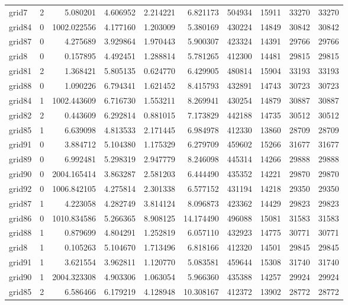\begin{longtable}{|l|r|r|r|r|r|r|r|r|r|}
grid7 & 2 & 5.080201 & 4.606952 & 2.214221 & 6.821173 & 504934 & 15911 & 33270 & 33270 \\
grid84 & 0 & 1002.022556 & 4.177160 & 1.203009 & 5.380169 & 430224 & 14849 & 30842 & 30842 \\
grid87 & 0 & 4.275689 & 3.929864 & 1.970443 & 5.900307 & 423324 & 14391 & 29766 & 29766 \\
grid8 & 0 & 0.157895 & 4.492451 & 1.288814 & 5.781265 & 412300 & 14481 & 29815 & 29815 \\
grid81 & 2 & 1.368421 & 5.805135 & 0.624770 & 6.429905 & 480814 & 15904 & 33193 & 33193 \\
grid88 & 0 & 1.090226 & 6.794341 & 1.621452 & 8.415793 & 432891 & 14743 & 30723 & 30723 \\
grid84 & 1 & 1002.443609 & 6.716730 & 1.553211 & 8.269941 & 430254 & 14879 & 30887 & 30887 \\
grid82 & 2 & 0.443609 & 6.292814 & 0.881015 & 7.173829 & 442188 & 14735 & 30512 & 30512 \\
grid85 & 1 & 6.639098 & 4.813533 & 2.171445 & 6.984978 & 412330 & 13860 & 28709 & 28709 \\
grid91 & 0 & 3.884712 & 5.104380 & 1.175329 & 6.279709 & 459602 & 15266 & 31677 & 31677 \\
grid89 & 0 & 6.992481 & 5.298319 & 2.947779 & 8.246098 & 445314 & 14266 & 29888 & 29888 \\
grid90 & 0 & 2004.165414 & 3.863287 & 2.581203 & 6.444490 & 435352 & 14221 & 29870 & 29870 \\
grid92 & 0 & 1006.842105 & 4.275814 & 2.301338 & 6.577152 & 431194 & 14218 & 29350 & 29350 \\
grid87 & 1 & 4.223058 & 4.282749 & 3.814124 & 8.096873 & 423362 & 14429 & 29823 & 29823 \\
grid86 & 0 & 1010.834586 & 5.266365 & 8.908125 & 14.174490 & 496088 & 15081 & 31583 & 31583 \\
grid88 & 1 & 0.879699 & 4.804291 & 1.252819 & 6.057110 & 432923 & 14775 & 30771 & 30771 \\
grid8 & 1 & 0.105263 & 5.104670 & 1.713496 & 6.818166 & 412320 & 14501 & 29845 & 29845 \\
grid91 & 1 & 3.621554 & 3.962811 & 1.120770 & 5.083581 & 459644 & 15308 & 31740 & 31740 \\
grid90 & 1 & 2004.323308 & 4.903306 & 1.063054 & 5.966360 & 435388 & 14257 & 29924 & 29924 \\
grid85 & 2 & 6.586466 & 6.179219 & 4.128948 & 10.308167 & 412372 & 13902 & 28772 & 28772 \\

\end{longtable}
